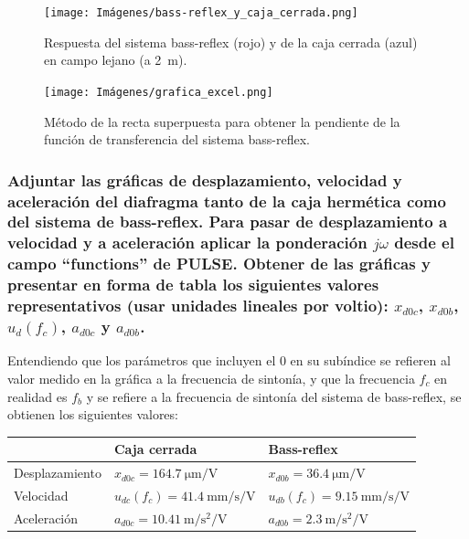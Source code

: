 \documentclass[10pt]{article}
\begin{document}
\begin{figure}[hbtp]
  \centering
  \texttt{[image: Imágenes/bass-reflex\_y\_caja\_cerrada.png]}
  \caption{Respuesta del sistema bass-reflex (rojo) y de la caja cerrada (azul) en campo lejano (a \qty{2}{\metre }).}
  \label{fig:bass-reflex_y_caja_cerrada.png}
\end{figure}

\begin{figure}[hbtp]
  \centering
  \texttt{[image: Imágenes/grafica\_excel.png]}
  \caption{Método de la recta superpuesta para obtener la pendiente de la función de transferencia del sistema bass-reflex.}
  \label{fig:grafica_excel.png}
\end{figure}

\subsubsection{Adjuntar las gráficas de desplazamiento, velocidad y aceleración del diafragma tanto de la caja hermética como del sistema de bass-reflex. Para pasar de desplazamiento a velocidad y a aceleración aplicar la ponderación $j \omega$ desde el campo ``functions'' de PULSE. Obtener de las gráficas y presentar en forma de tabla los siguientes valores representativos (usar unidades lineales por voltio): $x_{d0c}$, $x_{d0b}$, $u_d (f_c)$, $a_{d0c}$ y $a_{d0b}$.}

Entendiendo que los parámetros que incluyen el 0 en su subíndice se refieren al valor medido en la gráfica a la frecuencia de sintonía, y que la frecuencia $f_c$ en realidad es $f_b$ y se refiere a la frecuencia de sintonía del sistema de bass-reflex, se obtienen los siguientes valores:

\begin{table}[hbtp]
  \centering
  \begin{tabular}{|l|l|l|} \hline
                   & Caja cerrada                                                 & Bass-reflex                                                  \\ \hline
    Desplazamiento & $x_{d0c} = \qty{164.7}{\micro\metre\per\volt}$               & $x_{d0b} = \qty{36.4}{\micro\metre\per\volt}$                \\ \hline
    Velocidad      & $u_{dc}(f_c) = \qty{41.4}{\milli\metre\per\second\per\volt}$ & $u_{db}(f_c) = \qty{9.15}{\milli\metre\per\second\per\volt}$ \\ \hline
    Aceleración    & $a_{d0c} = \qty{10.41}{\metre\per\second\squared\per\volt}$  & $a_{d0b} = \qty{2.3}{\metre\per\second\squared\per\volt}$    \\ \hline
  \end{tabular}
\end{table}
\end{document}
